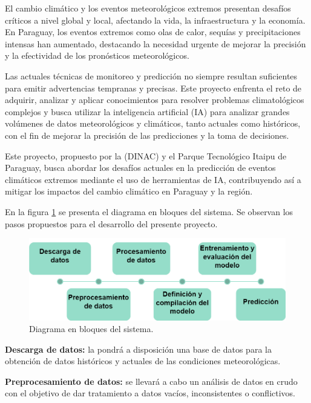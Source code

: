 \documentclass[
11pt, %
codirector, %
]{charter}
\begin{document}
El cambio climático y los eventos meteorológicos extremos presentan desafíos críticos a nivel global y local, afectando la vida, la infraestructura y la economía. En Paraguay, los eventos extremos como olas de calor, sequías y precipitaciones intensas han aumentado, destacando la necesidad urgente de mejorar la precisión y la efectividad de los pronósticos meteorológicos. 

Las actuales técnicas de monitoreo y predicción no siempre resultan suficientes para emitir advertencias tempranas y precisas. Este proyecto enfrenta el reto de adquirir, analizar y aplicar conocimientos para resolver problemas climatológicos complejos y busca utilizar la inteligencia artificial (IA) para analizar grandes volúmenes de datos meteorológicos y climáticos, tanto actuales como históricos, con el fin de mejorar la precisión de las predicciones y la toma de decisiones.

Este proyecto, propuesto por la \empclientename\hspace{1px} (DINAC) y el Parque Tecnológico Itaipu de Paraguay, busca abordar los desafíos actuales en la predicción de eventos climáticos extremos mediante el uso de herramientas de IA, contribuyendo así a mitigar los impactos del cambio climático en Paraguay y la región.

En la figura \ref{fig:diagBloques} se presenta el diagrama en bloques del sistema. Se observan los pasos propuestos para el desarrollo del presente proyecto. 

\begin{figure}[htpb]
\centering 
\includegraphics[width=.65\textwidth]{./Figuras/diagBloques.png}
\caption{Diagrama en bloques del sistema.}
\label{fig:diagBloques}
\end{figure}

\textbf{Descarga de datos:}
la \empclientename\hspace{1px} pondrá a disposición una base de datos para la obtención de datos históricos y actuales de las condiciones meteorológicas.

\textbf{Preprocesamiento de datos:}
se llevará a cabo un análisis de datos en crudo con el objetivo de dar tratamiento a datos vacíos, inconsistentes o conflictivos.
\end{document}
